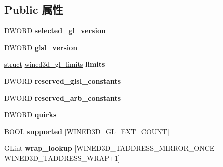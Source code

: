 \subsection*{Public 属性}
\begin{DoxyCompactItemize}
\item 
\mbox{\label{structwined3d__gl__info_af45caf978160d42ee65c546e273b8ba7}} 
D\+W\+O\+RD {\bfseries selected\+\_\+gl\+\_\+version}
\item 
\mbox{\label{structwined3d__gl__info_ad4d0b495adaadb09810c3a0a429d24a3}} 
D\+W\+O\+RD {\bfseries glsl\+\_\+version}
\item 
\mbox{\label{structwined3d__gl__info_a8ff850b8b301355240b42b2d4aaf239d}} 
\hyperlink{interfacestruct}{struct} \hyperlink{structwined3d__gl__limits}{wined3d\+\_\+gl\+\_\+limits} {\bfseries limits}
\item 
\mbox{\label{structwined3d__gl__info_a805dfb19d38fcf974c6b0d889f40ce68}} 
D\+W\+O\+RD {\bfseries reserved\+\_\+glsl\+\_\+constants}
\item 
\mbox{\label{structwined3d__gl__info_a19f3cc99807106fcd2cbf6cfc6190d46}} 
D\+W\+O\+RD {\bfseries reserved\+\_\+arb\+\_\+constants}
\item 
\mbox{\label{structwined3d__gl__info_a88aad4c31084f02b46c8ab1b9eb938d4}} 
D\+W\+O\+RD {\bfseries quirks}
\item 
\mbox{\label{structwined3d__gl__info_a434b13a92cca2f431fea6f2702f40363}} 
B\+O\+OL {\bfseries supported} \mbox{[}W\+I\+N\+E\+D3\+D\+\_\+\+G\+L\+\_\+\+E\+X\+T\+\_\+\+C\+O\+U\+NT\mbox{]}
\item 
\mbox{\label{structwined3d__gl__info_ae51f961e74b5ae61d58ca94687daf839}} 
G\+Lint {\bfseries wrap\+\_\+lookup} \mbox{[}W\+I\+N\+E\+D3\+D\+\_\+\+T\+A\+D\+D\+R\+E\+S\+S\+\_\+\+M\+I\+R\+R\+O\+R\+\_\+\+O\+N\+CE -\/ W\+I\+N\+E\+D3\+D\+\_\+\+T\+A\+D\+D\+R\+E\+S\+S\+\_\+\+W\+R\+AP+1\mbox{]}
\item 
\mbox{\label{structwined3d__gl__info_a26ca9d1417de8016bb12172d79c83bf5}} 

\end{DoxyCompactItemize}
